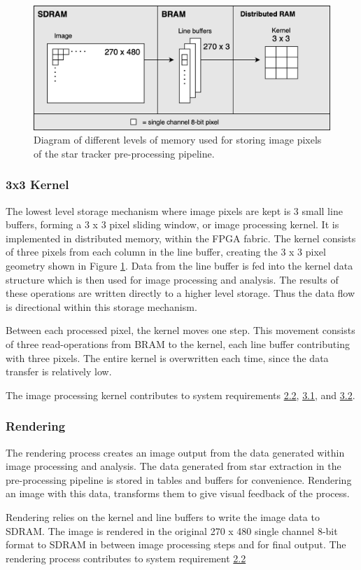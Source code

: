 \documentclass[12pt]{report}
\begin{document}
\begin{figure}[h]
    \centering
    \includegraphics[scale=0.3]{figures/mem_overview.png}
    \caption{Diagram of different levels of memory used for storing image pixels of the star tracker pre-processing pipeline.}
    \label{fig:mem_overview}
\end{figure}

\subsubsection{3x3 Kernel}
The lowest level storage mechanism where image pixels are kept is 3 small line buffers, forming a 3 x 3 pixel sliding window, or image processing kernel. It is implemented in distributed memory, within the FPGA fabric. The kernel consists of three pixels from each column in the line buffer, creating the 3 x 3 pixel geometry shown in Figure \ref*{fig:mem_overview}. Data from the line buffer is fed into the kernel data structure which is then used for image processing and analysis. The results of these operations are written directly to a higher level storage. Thus the data flow is directional within this storage mechanism.
\par
Between each processed pixel, the kernel moves one step. This movement consists of three read-operations from BRAM to the kernel, each line buffer contributing with three pixels. The entire kernel is overwritten each time, since the data transfer is relatively low.
\par
The image processing kernel contributes to system requirements \hyperref[req2.2]{2.2}, \hyperref[req3.1]{3.1}, and \hyperref[req3.2]{3.2}.

\subsubsection{Rendering}
The rendering process creates an image output from the data generated within image processing and analysis. The data generated from star extraction in the pre-processing pipeline is stored in tables and buffers for convenience. Rendering an image with this data, transforms them to give visual feedback of the process.
\par
Rendering relies on the kernel and line buffers to write the image data to SDRAM. The image is rendered in the original 270 x 480 single channel 8-bit format to SDRAM in between image processing steps and for final output. The rendering process contributes to system requirement \hyperref[req2.2]{2.2}
\end{document}
